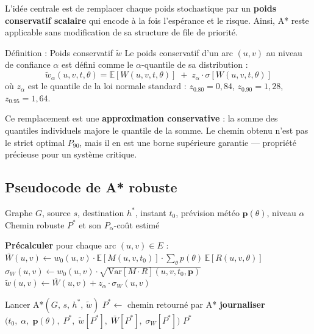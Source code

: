 \documentclass[12pt,a4paper]{article}
\theoremstyle{definition}
\theoremstyle{remark}
\begin{document}
L'idée centrale est de remplacer chaque poids stochastique par un
\textbf{poids conservatif scalaire} qui encode à la fois l'espérance
et le risque. Ainsi, A* reste applicable sans modification de sa
structure de file de priorité.

\begin{defbox}{Définition : Poids conservatif $\tilde{w}$}
Le poids conservatif d'un arc $(u,v)$ au niveau de confiance $\alpha$
est défini comme le $\alpha$-quantile de sa distribution :
\[
  \tilde{w}_\alpha(u,v,t,\theta) =
  \mathbb{E}[W(u,v,t,\theta)] \;+\; z_\alpha \cdot \sigma[W(u,v,t,\theta)]
\]
où $z_\alpha$ est le quantile de la loi normale standard :
$z_{0.80} = 0{,}84$, $z_{0.90} = 1{,}28$, $z_{0.95} = 1{,}64$.
\end{defbox}

Ce remplacement est une \textbf{approximation conservative} : la somme
des quantiles individuels majore le quantile de la somme. Le chemin
obtenu n'est pas le strict optimal $P_{90}$, mais il en est une borne
supérieure garantie — propriété précieuse pour un système critique.

\subsection{Pseudocode de A* robuste}

\begin{algorithm}[H]
\caption{A* Robuste — poids stochastiques au niveau $\alpha$}
\begin{algorithmic}[1]
\Require Graphe $G$, source $s$, destination $h^*$, instant $t_0$,
         prévision météo $\mathbf{p}(\theta)$, niveau $\alpha$
\Ensure Chemin robuste $P^*$ et son $P_\alpha$-coût estimé

\State \textbf{Précalculer} pour chaque arc $(u,v) \in E$ :
\State \quad $\bar{W}(u,v) \gets w_0(u,v) \cdot
       \mathbb{E}[M(u,v,t_0)] \cdot \sum_\theta p(\theta)\,\mathbb{E}[R(u,v,\theta)]$
\State \quad $\sigma_W(u,v) \gets w_0(u,v) \cdot
       \sqrt{\text{Var}[M \cdot R](u,v,t_0,\mathbf{p})}$
\State \quad $\tilde{w}(u,v) \gets \bar{W}(u,v) + z_\alpha \cdot \sigma_W(u,v)$

\Statex
\State Lancer A*$(G,\, s,\, h^*,\, \tilde{w})$
\State $P^* \gets$ chemin retourné par A*
\State \textbf{journaliser}$\bigl(t_0,\; \alpha,\; \mathbf{p}(\theta),\;
       P^*,\; \tilde{w}[P^*],\; \bar{W}[P^*],\; \sigma_W[P^*]\bigr)$
\State \Return $P^*$
\end{algorithmic}
\end{algorithm}
\end{document}
